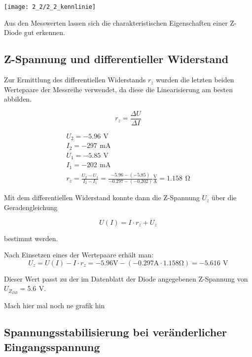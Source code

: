 \documentclass[a4paper, 12pt]{article}
\begin{document}
\begin{center}
 \texttt{[image: 2\_2/2\_2\_kennlinie]}
\end{center}

Aus den Messwerten lassen sich die charakteristischen Eigenschaften einer
Z-Diode gut erkennen.

\subsection{Z-Spannung und differentieller Widerstand}

Zur Ermittlung des differentiellen Widerstands $r_z$ wurden die letzten beiden
Wertepaare der Messreihe verwendet, da diese die Linearisierung am besten
abbilden.

$$ r_z = \frac{\Delta U}{\Delta I} $$

\begin{gather*}
  U_2 = -5.96 \,\ \si{\volt}\\
  I_2 = -297 \,\ \si{\milli\ampere}\\
  U_1 = -5.85 \,\ \si{\volt}\\
  I_1 = -202 \,\ \si{\milli\ampere}\\
  r_z = \frac{U_2 - U_1}{I_2-I_1} = \frac{-5.96 - (-5.85)}{-0.297 - (-0.202)}
  \frac{\si{\volt}}{\si{\ampere}} = 1.158 \,\ \si{\ohm}
\end{gather*}

Mit dem differentiellen Widerstand konnte dann die Z-Spannung $U_z$ über die Geradengleichung

$$U(I) = I \cdot r_z + U_z$$

\noindent bestimmt werden.

\noindent Nach Einsetzen eines der Wertepaare erhält man:
$$ U_z = U(I) - I\cdot r_z = -5.96 \si{\volt} - (-0.297 \si{\ampere} \cdot 1.158
\si{\ohm}) = -5.616 \,\ \si{\volt} $$

\noindent Dieser Wert passt zu der im Datenblatt der Diode angegebenen
Z-Spannung von $U_{Z_{DB}} = 5.6 \,\ \si{\volt}$.

\holine{\textwidth}
Mach hier mal noch ne grafik hin
\holine{\textwidth}

\subsection{Spannungsstabilisierung bei veränderlicher Eingangsspannung}
\end{document}
